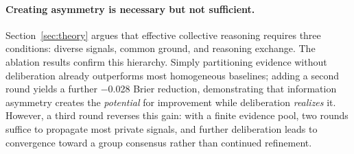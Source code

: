 \documentclass[11pt]{article}
\theoremstyle{plain}
\theoremstyle{definition}
\begin{document}
\begin{table}[ht]
\centering
\caption{Ablation results on \textsc{PolyGym}. Each row varies one component from the default InfoDelphi configuration. \textbf{Bold} is the best.}

\label{tab:ablation}
\vspace{-1em}
\end{table}

\paragraph{ Creating asymmetry is necessary but not sufficient.}
Section~\ref{sec:theory} argues that effective collective reasoning requires three conditions: diverse signals, common ground, and reasoning exchange.
The ablation results confirm this hierarchy.
Simply partitioning evidence without deliberation already outperforms most homogeneous baselines; adding a second round yields a further $-$0.028 Brier reduction, demonstrating that information asymmetry creates the \textit{potential} for improvement while deliberation \textit{realizes} it.
However, a third round reverses this gain: with a finite evidence pool, two rounds suffice to propagate most private signals, and further deliberation leads to convergence toward a group consensus rather than continued refinement.
\end{document}
